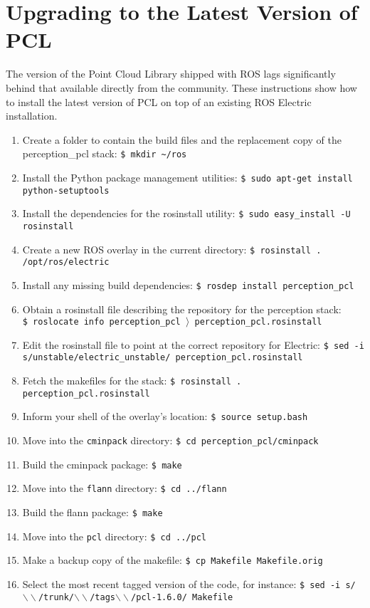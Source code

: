 \documentclass[12pt]{report}
\begin{document}
\section{Upgrading to the Latest Version of PCL}
\label{apx:upgrade}
The version of the Point Cloud Library shipped with ROS lags significantly behind that available directly from the community.  These instructions show how to install the latest version of PCL on top of an existing ROS Electric installation.
\begin{enumerate}
\item{Create a folder to contain the build files and the replacement copy of the perception\_pcl stack: \texttt{\$\ mkdir \~{}/ros}}
\item{Install the Python package management utilities: \texttt{\$\ sudo apt-get install python-setuptools}}
\item{Install the dependencies for the rosinstall utility: \texttt{\$\ sudo easy\_install -U rosinstall}}
\item{Create a new ROS overlay in the current directory: \texttt{\$\ rosinstall . /opt/ros/electric}}
\item{Install any missing build dependencies: \texttt{\$\ rosdep install perception\_pcl}}
\item{Obtain a rosinstall file describing the repository for the perception stack: \texttt{\$\ roslocate info perception\_pcl $\rangle$ perception\_pcl.rosinstall}}
\item{Edit the rosinstall file to point at the correct repository for Electric: \texttt{\$\ sed -i s/unstable/electric\_unstable/ perception\_pcl.rosinstall }}
\item{Fetch the makefiles for the stack: \texttt{\$\ rosinstall . perception\_pcl.rosinstall}}
\item{Inform your shell of the overlay's location: \texttt{\$\ source setup.bash}}
\item{Move into the \texttt{cminpack} directory: \texttt{\$\ cd perception\_pcl/cminpack}}
\item{Build the cminpack package: \texttt{\$\ make}}
\item{Move into the \texttt{flann} directory: \texttt{\$\ cd ../flann}}
\item{Build the flann package: \texttt{\$\ make}}
\item{Move into the \texttt{pcl} directory: \texttt{\$\ cd ../pcl}}
\item{Make a backup copy of the makefile: \texttt{\$\ cp Makefile Makefile.orig}}
\item{Select the most recent tagged version of the code, for instance: \texttt{\$\ sed -i s/$\backslash\backslash$/trunk/$\backslash\backslash$/tags$\backslash\backslash$/pcl-1.6.0/ Makefile}}

\end{enumerate}
\end{document}
